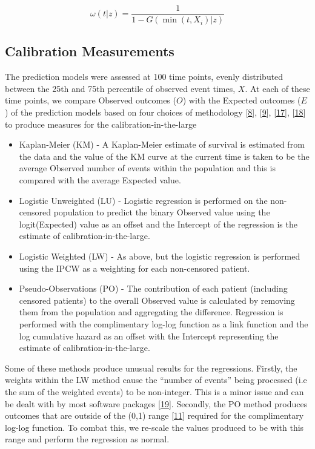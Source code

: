 \documentclass[
]{article}
\providecommand{\tightlist}{%
  \setlength{\itemsep}{0pt}\setlength{\parskip}{0pt}}
\begin{document}
\[
\omega(t|z) = \frac{1}{1 - G(\min(t,X_i)|z)}
\]

\hypertarget{calibration-measurements}{%
\subsection{Calibration Measurements}\label{calibration-measurements}}

The prediction models were assessed at 100 time points, evenly distributed between the 25th and 75th percentile of observed event times, \(X\). At each of these time points, we compare Observed outcomes (\(O\)) with the Expected outcomes (\(E\)) of the prediction models based on four choices of methodology {[}\protect\hyperlink{ref-royston_tools_2014}{8}{]}, {[}\protect\hyperlink{ref-royston_tools_2015}{9}{]}, {[}\protect\hyperlink{ref-riley_prognosis_2019}{17}{]}, {[}\protect\hyperlink{ref-andersen_pseudo-observations_2010}{18}{]} to produce measures for the calibration-in-the-large
\begin{itemize}
\tightlist
\item
  Kaplan-Meier (KM) - A Kaplan-Meier estimate of survival is estimated from the data and the value of the KM curve at the current time is taken to be the average Observed number of events within the population and this is compared with the average Expected value.
\item
  Logistic Unweighted (LU) - Logistic regression is performed on the non-censored population to predict the binary Observed value using the logit(Expected) value as an offset and the Intercept of the regression is the estimate of calibration-in-the-large.
\item
  Logistic Weighted (LW) - As above, but the logistic regression is performed using the IPCW as a weighting for each non-censored patient.
\item
  Pseudo-Observations (PO) - The contribution of each patient (including censored patients) to the overall Observed value is calculated by removing them from the population and aggregating the difference. Regression is performed with the complimentary log-log function as a link function and the log cumulative hazard as an offset with the Intercept representing the estimate of calibration-in-the-large.
\end{itemize}
Some of these methods produce unusual results for the regressions. Firstly, the weights within the LW method cause the ``number of events'' being processed (i.e the sum of the weighted events) to be non-integer. This is a minor issue and can be dealt with by most software packages {[}\protect\hyperlink{ref-wildscop_biostatistics_2013}{19}{]}. Secondly, the PO method produces outcomes that are outside of the (0,1) range {[}\protect\hyperlink{ref-perme_checking_2008}{11}{]} required for the complimentary log-log function. To combat this, we re-scale the values produced to be with this range and perform the regression as normal.
\end{document}
